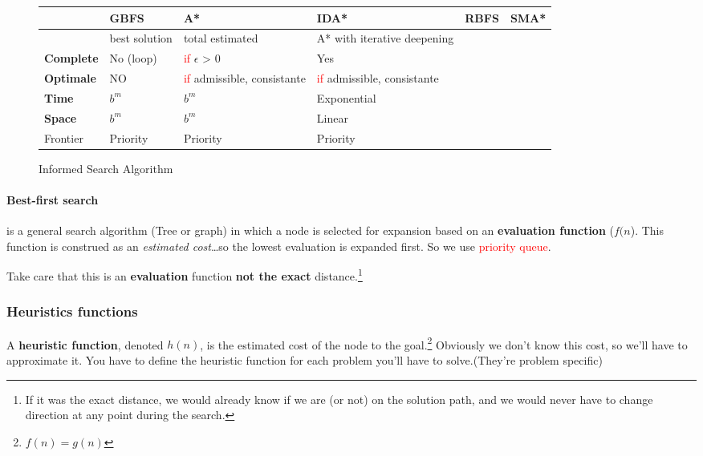 \begin{figure}[h]
    \centering
    \begin{tabular}{|l|m{2.5cm}|m{2.5cm}|m{2.5cm}|m{2.5cm}|m{2.5cm}|}
        \hline
        & \textbf{GBFS} & \textbf{A*} & \textbf{IDA*} & \textbf{RBFS} & \textbf{SMA*} \\
        \hline
        & best solution & total estimated & A* with iterative deepening & \\

        \hline
        \hline
        \textbf{Complete} & No (loop) & \textcolor{red}{if} $\epsilon$ > 0 & Yes  \\
        \hline
        \textbf{Optimale} & NO & \textcolor{red}{if} admissible, consistante & \textcolor{red}{if} admissible, consistante\\
        \hline
        \textbf{Time} & $b^m$ & $b^m$ & Exponential\\
        \hline
        \textbf{Space} &$b^m$ & $b^m$ & Linear\\
        \hline
        Frontier & Priority & Priority &Priority &\\
        \hline
    \end{tabular}
    \caption{Informed Search Algorithm}
\end{figure}


\paragraph{Best-first search}

is a general search algorithm (Tree or graph) in which a node is selected
for  expansion based  on  an \textbf{evaluation  function} ($f(n$).  This
function is  construed as an  \textit{estimated cost}\ldots so  the lowest
evaluation is expanded first. So we use \textcolor{red}{priority queue}.

Take care that  this is an \textbf{evaluation}  function \textbf{not the
exact} distance.\footnote{If it was the exact distance, we would already
know if we are (or not) on the solution path, and we would never have to
change direction at any point during the search.}

\subsubsection{Heuristics functions}

A \textbf{heuristic function}, denoted $h(n)$, is the estimated cost of the node to the goal.\footnote{$f(n)=g(n)$} Obviously we don't know this cost, so we'll have to approximate it. You have to define the heuristic function for each problem you'll have to solve.(They're problem specific) 

